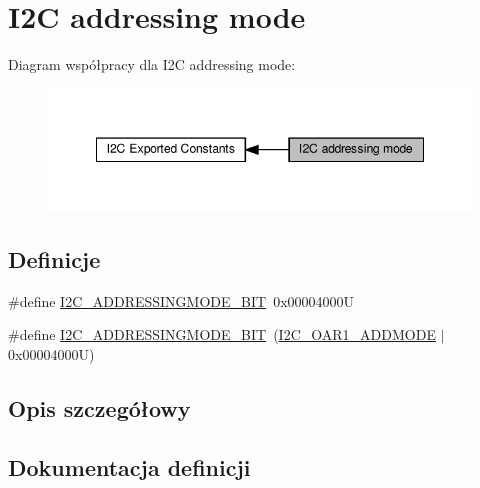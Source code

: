 \hypertarget{group___i2_c__addressing__mode}{}\section{I2C addressing mode}
\label{group___i2_c__addressing__mode}
Diagram współpracy dla I2C addressing mode\+:\nopagebreak
\begin{figure}[H]
\begin{center}
\leavevmode
\includegraphics[width=348pt]{group___i2_c__addressing__mode}
\end{center}
\end{figure}
\subsection*{Definicje}
\begin{DoxyCompactItemize}
\item 
\#define \hyperlink{group___i2_c__addressing__mode_ga28cf3b277595ac15edf383c2574ed18d}{I2\+C\+\_\+\+A\+D\+D\+R\+E\+S\+S\+I\+N\+G\+M\+O\+D\+E\+\_\+B\+IT}~0x00004000U
\item 
\#define \hyperlink{group___i2_c__addressing__mode_ga2401dc32e64cd53290497bab73c3608d}{I2\+C\+\_\+\+A\+D\+D\+R\+E\+S\+S\+I\+N\+G\+M\+O\+D\+E\+\_\+B\+IT}~(\hyperlink{group___peripheral___registers___bits___definition_ga7d8df80cd27313c896e887aae81fa639}{I2\+C\+\_\+\+O\+A\+R1\+\_\+\+A\+D\+D\+M\+O\+DE} $\vert$ 0x00004000\+U)
\end{DoxyCompactItemize}


\subsection{Opis szczegółowy}


\subsection{Dokumentacja definicji}
\mbox{\label{group___i2_c__addressing__mode_ga2401dc32e64cd53290497bab73c3608d}} 
